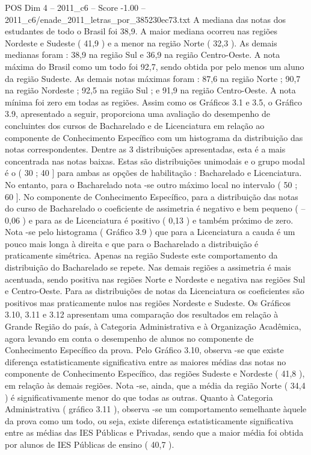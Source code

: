 \begin{textsample}{POS Dim 4 – 2011\_c6 – Score -1.00 – 2011\_c6/enade\_2011\_letras\_por\_385230ec73.txt}
A mediana das notas dos estudantes de todo o Brasil foi 38,9.
A maior mediana ocorreu nas regiões Nordeste e Sudeste ( 41,9 ) e a menor na região Norte ( 32,3 ).
As demais medianas foram : 38,9 na região Sul e 36,9 na região Centro-Oeste.
A nota máxima do Brasil como um todo foi 92,7, sendo obtida por pelo menos um aluno da região Sudeste.
As demais notas máximas foram : 87,6 na região Norte ; 90,7 na região Nordeste ; 92,5 na região Sul ; e 91,9 na região Centro-Oeste.
A nota mínima foi zero em todas as regiões.
Assim como os Gráficos 3.1 e 3.5, o Gráfico 3.9, apresentado a seguir, proporciona uma avaliação do desempenho de concluintes dos cursos de Bacharelado e de Licenciatura em relação ao componente de Conhecimento Específico com um histograma da distribuição das notas correspondentes.
Dentre as 3 distribuições apresentadas, esta é a mais concentrada nas notas baixas.
Estas são distribuições unimodais e o grupo modal é o ( 30 ; 40 ] para ambas as opções de habilitação : Bacharelado e Licenciatura.
No entanto, para o Bacharelado nota -se outro máximo local no intervalo ( 50 ; 60 ].
No componente de Conhecimento Específico, para a distribuição das notas do curso de Bacharelado o coeficiente de assimetria é negativo e bem pequeno ( – 0,06 ) e para as de Licenciatura é positivo ( 0,13 ) e também próximo de zero.
Nota -se pelo histograma ( Gráfico 3.9 ) que para a Licenciatura a cauda é um pouco mais longa à direita e que para o Bacharelado a distribuição é praticamente simétrica.
Apenas na região Sudeste este comportamento da distribuição do Bacharelado se repete.
Nas demais regiões a assimetria é mais acentuada, sendo positiva nas regiões Norte e Nordeste e negativa nas regiões Sul e Centro-Oeste.
Para as distribuições de notas da Licenciatura os coeficientes são positivos mas praticamente nulos nas regiões Nordeste e Sudeste.
Os Gráficos 3.10, 3.11 e 3.12 apresentam uma comparação dos resultados em relação à Grande Região do país, à Categoria Administrativa e à Organização Acadêmica, agora levando em conta o desempenho de alunos no componente de Conhecimento Específico da prova.
Pelo Gráfico 3.10, observa -se que existe diferença estatisticamente significativa entre as maiores médias das notas no componente de Conhecimento Específico, das regiões Sudeste e Nordeste ( 41,8 ), em relação às demais regiões.
Nota -se, ainda, que a média da região Norte ( 34,4 ) é significativamente menor do que todas as outras.
Quanto à Categoria Administrativa ( gráfico 3.11 ), observa -se um comportamento semelhante àquele da prova como um todo, ou seja, existe diferença estatisticamente significativa entre as médias das IES Públicas e Privadas, sendo que a maior média foi obtida por alunos de IES Públicas de ensino ( 40,7 ).

\end{textsample}
